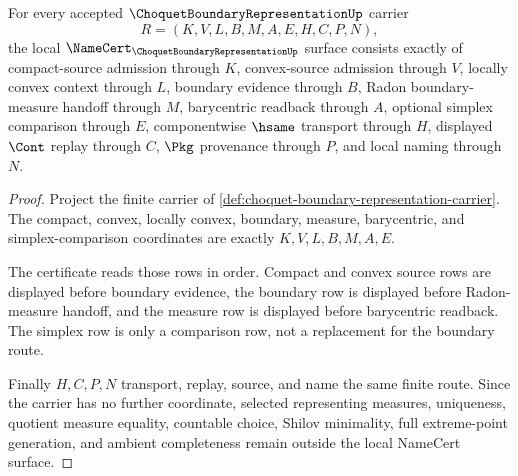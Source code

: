 \begin{theorem}
\label{thm:choquet-boundary-representation-namecert-obligations}
For every accepted $\ChoquetBoundaryRepresentationUp$ carrier
$$
R=(K,V,L,B,M,A,E,H,C,P,N),
$$
the local $\NameCert_{\ChoquetBoundaryRepresentationUp}$ surface consists exactly of compact-source admission through $K$, convex-source admission through $V$, locally convex context through $L$, boundary evidence through $B$, Radon boundary-measure handoff through $M$, barycentric readback through $A$, optional simplex comparison through $E$, componentwise $\hsame$ transport through $H$, displayed $\Cont$ replay through $C$, $\Pkg$ provenance through $P$, and local naming through $N$.
\end{theorem}
\begin{proof}
Project the finite carrier of \autoref{def:choquet-boundary-representation-carrier}. The compact, convex, locally convex, boundary, measure, barycentric, and simplex-comparison coordinates are exactly $K,V,L,B,M,A,E$.

The certificate reads those rows in order. Compact and convex source rows are displayed before boundary evidence, the boundary row is displayed before Radon-measure handoff, and the measure row is displayed before barycentric readback. The simplex row is only a comparison row, not a replacement for the boundary route.

Finally $H,C,P,N$ transport, replay, source, and name the same finite route. Since the carrier has no further coordinate, selected representing measures, uniqueness, quotient measure equality, countable choice, Shilov minimality, full extreme-point generation, and ambient completeness remain outside the local NameCert surface.
\end{proof}


